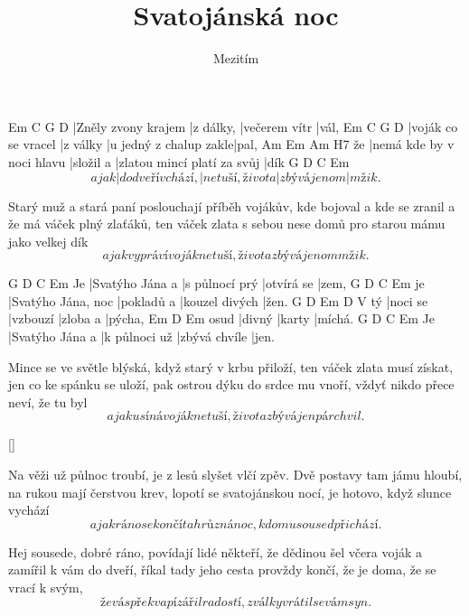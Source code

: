 \documentclass{song}
\author{Mezitím}
\title{Svatojánská noc}
\begin{document}
\strophe
Em                  C         G             D
|Zněly zvony krajem |z dálky, |večerem vítr |vál,
Em                  C        G                      D
|voják co se vracel |z války |u jedný z chalup zakle|pal,
   Am                        Em        Am                          H7
že |nemá kde by v noci hlavu |složil a |zlatou mincí platí za svůj |dík
         G                 D               C            Em
\[ a jak |do dveří vchází, |netuší, života |zbývá jenom |mžik. \]
\endstrophe

\strophe*
Starý muž a stará paní poslouchají příběh vojákův,
kde bojoval a kde se zranil a že má váček plný zlaťáků,
ten váček zlata s sebou nese domů pro starou mámu jako velkej dík
\[ a jak vypráví voják netuší, života zbývá jenom mžik. \]
\endstrophe

   G               D              C          Em
Je |Svatýho Jána a |s půlnocí prý |otvírá se |zem,
   G                  D          C              Em
je |Svatýho Jána, noc |pokladů a |kouzel divých |žen.
     G        D        Em       D
V tý |noci se |vzbouzí |zloba a |pýcha,
     Em     D      Em
osud |divný |karty |míchá.
   G               D             C             Em
Je |Svatýho Jána a |k půlnoci už |zbývá chvíle |jen.
\endstrophe

\strophe*
Mince se ve světle blýská, když starý v krbu přiloží,
ten váček zlata musí získat, jen co ke spánku se uloží,
pak ostrou dýku do srdce mu vnoří, vždyť nikdo přece neví, že tu byl
\[ a jak usíná voják netuší, života zbývá jen pár chvil. \]
\endstrophe

\ref{}

\strophe*
Na věži už půlnoc troubí, je z lesů slyšet vlčí zpěv.
Dvě postavy tam jámu hloubí, na rukou mají čerstvou krev,
lopotí se svatojánskou nocí, je hotovo, když slunce vychází
\[ a jak ráno se končí ta hrůzná noc, k domu soused přichází. \]
\endstrophe

\strophe*
Hej sousede, dobré ráno, povídají lidé někteří,
že dědinou šel včera voják a zamířil k vám do dveří, říkal
tady jeho cesta provždy končí, že je doma, že se vrací k svým,
\[ že vás překvapí zářil radostí, z války vrátil se vám syn. \]
\endstrophe
\end{document}
